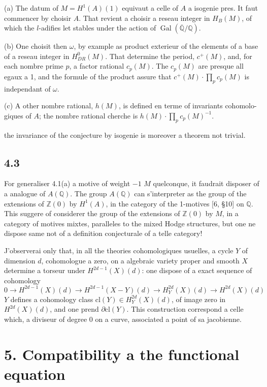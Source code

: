 \documentclass[12pt,a4paper]{article}
\theoremstyle{plain}
\theoremstyle{definition}
\theoremstyle{remark}
\DeclareMathOperator{\Gal}{Gal}
\newcommand{\Q}{\mathbb{Q}}
\newcommand{\Z}{\mathbb{Z}}
\begin{document}
(a) The datum of $M = H^1(A)(1)$ equivaut a celle of $A$ a isogenie pres. It faut
commencer by choisir $A$. That revient a choisir a reseau integer in $H_B(M)$, of which
the $l$-adifies let stables under the action of $\Gal(\overline{\Q}/\Q)$.

(b) One choisit then $\omega$, by example as product exterieur of the elements of a
base of a reseau integer in $H^0_{DR}(M)$. That determine the period, $c^+(M)$, and, for each nombre prime $p$, a factor rational $c_p(M)$. The $c_p(M)$ are presque all
egaux a 1, and the formule of the product assure that $c^+(M) \cdot \prod_p c_p(M)$ is independant
of $\omega$.

(c) A other nombre rational, $h(M)$, is defined en terme of invariants cohomolo-
giques of $A$; the nombre rational cherche is $h(M) \cdot \prod_p c_p(M)^{-1}$.

the invariance of the conjecture by isogenie is moreover a theorem not trivial.

\subsection*{4.3}

For generaliser 4.1(a) a motive of weight $-1$ $M$ quelconque, it faudrait
disposer of a analogue of $A(\Q)$. The group $A(\Q)$ can s'interpreter as the
group of the extensions of $\Z(0)$ by $H^1(A)$, in the category of the 1-motives [6, \S 10] on
$\Q$. This suggere of considerer the group of the extensions of $\Z(0)$ by $M$, in a
category of motives mixtes, paralleles to the mixed Hodge structures, but one ne
dispose same not of a definition conjecturale of a telle category!

J'observerai only that, in all the theories cohomologiques usuelles, a
cycle $Y$ of dimension $d$, cohomologue a zero, on a algebraic variety proper and
smooth $X$ determine a torseur under $H^{2d-1}(X)(d)$: one dispose of a exact sequence of
cohomology
\[
0 \to H^{2d-1}(X)(d) \to H^{2d-1}(X - Y)(d) \to H^{2d}_Y(X)(d) \to H^{2d}(X)(d)
\]
$Y$ defines a cohomology class $\text{cl}(Y) \in H^{2d}_Y(X)(d)$, of image zero in
$H^{2d}(X)(d)$, and one prend $\partial \text{cl}(Y)$. This construction correspond a celle which, a
diviseur of degree 0 on a curve, associated a point of sa jacobienne.


\section*{5. Compatibility a the functional equation}
\end{document}
